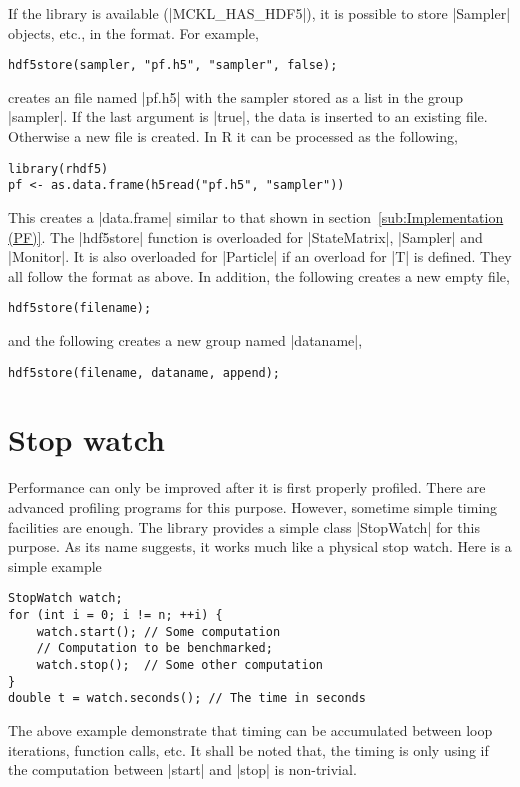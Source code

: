 If the \hdf library is available (|MCKL_HAS_HDF5|), it is possible to store
|Sampler| objects, etc., in the \hdf format. For example,
\begin{verbatim}
hdf5store(sampler, "pf.h5", "sampler", false);
\end{verbatim}
creates an \hdf file named |pf.h5| with the sampler stored as a list in the
group |sampler|. If the last argument is |true|, the data is inserted to an
existing file. Otherwise a new file is created. In R it can be processed as the
following,
\begin{verbatim}
library(rhdf5)
pf <- as.data.frame(h5read("pf.h5", "sampler"))
\end{verbatim}
This creates a |data.frame| similar to that shown in
section~\ref{sub:Implementation (PF)}. The |hdf5store| function is overloaded
for |StateMatrix|, |Sampler| and |Monitor|. It is also overloaded for
|Particle| if an overload for |T| is defined. They all follow the format as
above. In addition, the following creates a new empty \hdf file,
\begin{verbatim}
hdf5store(filename);
\end{verbatim}
and the following creates a new group named |dataname|,
\begin{verbatim}
hdf5store(filename, dataname, append);
\end{verbatim}

\section{Stop watch}
\label{sec:Stop watch}

Performance can only be improved after it is first properly profiled. There are
advanced profiling programs for this purpose. However, sometime simple timing
facilities are enough. The library provides a simple class |StopWatch| for this
purpose. As its name suggests, it works much like a physical stop watch. Here
is a simple example
\begin{verbatim}
StopWatch watch;
for (int i = 0; i != n; ++i) {
    watch.start(); // Some computation
    // Computation to be benchmarked;
    watch.stop();  // Some other computation
}
double t = watch.seconds(); // The time in seconds
\end{verbatim}
The above example demonstrate that timing can be accumulated between loop
iterations, function calls, etc. It shall be noted that, the timing is only
using if the computation between |start| and |stop| is non-trivial.
